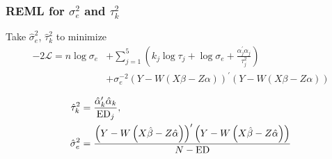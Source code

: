 \documentclass[12pt]{beamer}
\newcommand{\ms}{\scriptscriptstyle}
\begin{document}
\begin{frame}
\frametitle{REML for $\sigma_e^2$ and $\tau_k^2$ }

Take $\hat{\sigma}_e^2$, $\hat{\tau}_k^2$ to minimize
\begin{align*}
-2\mathcal{L}= n \log \sigma_e &+ \sum_{j=1}^5 \left( k_j \log \tau_j + \log \sigma_e + \frac{\alpha_j^\prime \alpha_j}{\tau_j^2}\right)  \\[5pt]
&+ \sigma_e^{-2}\left(Y - W\left(X\beta - Z\alpha \right) \right)^\prime  \left(Y - W\left(X\beta - Z\alpha \right) \right) 
\end{align*}


\begin{align*}
\hat{\tau}_k^2 &=  \frac{\hat{\alpha}_k^\prime\hat{\alpha}_k}{  \textup{ED}_j}, \\
 \hat{\sigma}_e^2 &= \frac{\left(Y - W\left(X\hat{\beta} - Z\hat{\alpha}\right) \right)^\prime  \left(Y - W\left(X\hat{\beta} - Z\hat{\alpha}\right) \right)}{N - \textup{ED}}
\end{align*}
\end{frame}

%
%
%
%
%
%
%
%
\end{document}
